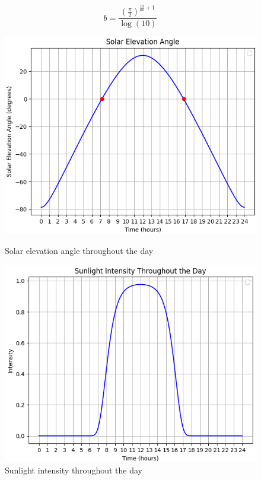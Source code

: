 \documentclass{article}
\begin{document}
\[
  b = \frac{\left(\frac{\pi}{2}\right)^{\frac{m}{60} + 1}}{\log(10)}
\]

\begin{figure}[h]
  \centering
  \begin{minipage}{0.45\textwidth}
      \centering
      \includegraphics[width=\textwidth]{images/SolarElevetion35N.png}
      \caption{Solar elevation angle throughout the day}
      \label{fig:SolarElevetion35N}
  \end{minipage}\hfill
  \begin{minipage}{0.45\textwidth}
      \centering
      \includegraphics[width=\textwidth]{images/SunlightIntensity35N.png}
      \caption{Sunlight intensity throughout the day}
      \label{fig:SunlightIntensity35N}
  \end{minipage}
\end{figure}
\end{document}
